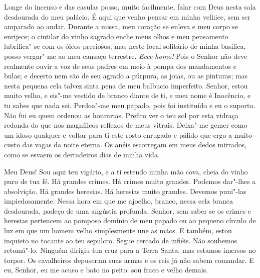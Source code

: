 Longe do incenso e das casulas posso, muito facilmente, falar com Deus
nesta sala desdourada do meu palácio.  É aqui que  venho pensar  em minha
velhice, sem ser amparado ao andar. Durante a missa, meu coração se enleva
e meu corpo se enrijece; o cintilar do vinho sagrado enche meus olhos e
meu pensamento lubrifica"-se com os óleos preciosos; mas neste local
solitário de minha basílica, posso vergar"-me ao meu cansaço terrestre.
\textit{Ecce homo!} Pois o Senhor não deve realmente ouvir a voz de seus
padres em meio à pompa dos mandamentos e bulas; e decerto nem são de seu
agrado a púrpura, as joias, ou as pinturas; mas nesta pequena cela talvez
sinta pena de meu balbucio imperfeito. Senhor, estou muito velho, e eis"-me
vestido de branco diante de ti, e meu nome é Inocêncio, e tu sabes que
nada sei. Perdoa"-me meu papado, pois foi instituído e eu o suporto. Não
fui eu quem ordenou as honrarias. Prefiro ver o teu sol por esta vidraça
redonda do que nos magníficos reflexos de meus vitrais. Deixa"-me gemer
como um idoso qualquer e voltar para ti este rosto enrugado e pálido que
ergo a muito custo das vagas da noite eterna. Os anéis escorregam em meus
dedos mirrados, como se esvaem os derradeiros dias de minha vida.

Meu Deus! Sou aqui teu vigário, e a ti estendo minha mão cova, cheia do
vinho puro de tua fé. Há grandes crimes. Há crimes muito grandes. Podemos
dar"-lhes a absolvição. Há grandes heresias. Há heresias muito grandes.
Devemos puni"-las impiedosamente. Nessa hora em que me ajoelho, branco,
nessa cela branca desdourada, padeço de uma angústia profunda, Senhor, sem
saber se os crimes e heresias pertencem ao pomposo domínio de meu papado
ou ao pequeno círculo de luz em que um homem velho simplesmente une as
mãos. E também, estou inquieto no tocante ao teu sepulcro. Segue cercado
de infiéis. Não soubemos retomá"-lo. Ninguém dirigiu tua cruz para a Terra
Santa; mas estamos imersos no torpor. Os cavalheiros depuseram suas armas
e os reis já não sabem comandar. E eu, Senhor, eu me acuso e bato no
peito: sou fraco e velho demais.

